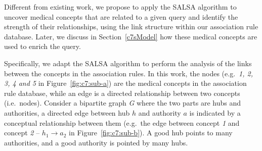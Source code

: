 \documentclass[1p]{elsarticle}
\begin{document}
Different from existing work, we propose to apply the SALSA algorithm to uncover medical concepts that are related to a given query and identify the strength of their relationships, using the link structure within our association rule database. Later, we discuss in Section~\ref{c7sModel} how these medical concepts are used to enrich the query.

Specifically, we adapt the SALSA algorithm to perform the analysis of the links between the concepts in the association rules. In this work, the nodes (e.g.\ \emph{1, 2, 3, 4 and 5} in Figure~\ref{fig:c7:sub-a}) are the medical concepts in the association rule database, while an edge is a directed relationship between two concepts (i.e.\ nodes). Consider a bipartite graph \emph{G} where the two parts are hubs and authorities, a directed edge between hub $h$ and authority $a$ is indicated by a conceptual relationship between them (e.g.\ the edge between concept \emph{1} and concept \emph{2} -- $h_1 \rightarrow a_2$ in Figure~\ref{fig:c7:sub-b}). A good hub points to many authorities, and a good authority is pointed by many hubs. 

\end{document}
